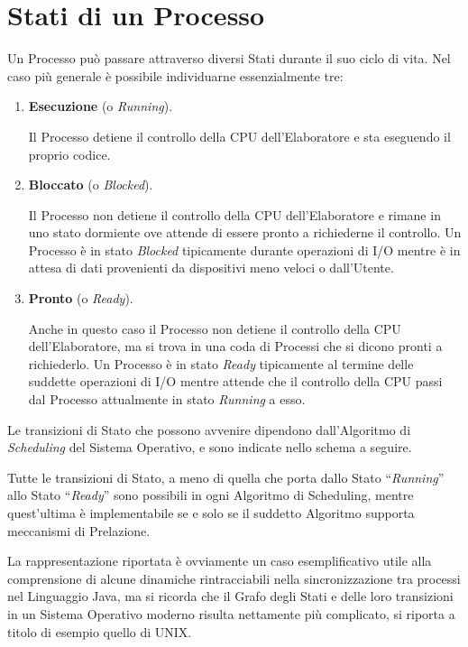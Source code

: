 \section{Stati di un Processo}
Un Processo può passare attraverso diversi Stati durante il suo ciclo di vita. Nel caso più generale è possibile individuarne essenzialmente tre:
\begin{enumerate}
    \item \textbf{Esecuzione} (o \textit{Running}). \par
    Il Processo detiene il controllo della CPU dell'Elaboratore e sta eseguendo il proprio codice.
    \item \textbf{Bloccato} (o \textit{Blocked}). \par
    Il Processo non detiene il controllo della CPU dell'Elaboratore e rimane in uno stato dormiente ove attende di essere pronto a richiederne il controllo. Un Processo è in stato \textit{Blocked} tipicamente durante operazioni di I/O mentre è in attesa di dati provenienti da dispositivi meno veloci o dall'Utente.
    \item \textbf{Pronto} (o \textit{Ready}). \par
    Anche in questo caso il Processo non detiene il controllo della CPU dell'Elaboratore, ma si trova in una coda di Processi che si dicono pronti a richiederlo. Un Processo è in stato \textit{Ready} tipicamente al termine delle suddette operazioni di I/O mentre attende che il controllo della CPU passi dal Processo attualmente in stato \textit{Running} a esso.
\end{enumerate}
Le transizioni di Stato che possono avvenire dipendono dall'Algoritmo di \textit{Scheduling} del Sistema Operativo, e sono indicate nello schema a seguire.

Tutte le transizioni di Stato, a meno di quella che porta dallo Stato ``\textit{Running}'' allo Stato ``\textit{Ready}'' sono possibili in ogni Algoritmo di Scheduling, mentre quest'ultima è implementabile se e solo se il suddetto Algoritmo supporta meccanismi di Prelazione. \par
La rappresentazione riportata è ovviamente un caso esemplificativo utile alla comprensione di alcune dinamiche rintracciabili nella sincronizzazione tra processi nel Linguaggio Java, ma si ricorda che il Grafo degli Stati e delle loro transizioni in un Sistema Operativo moderno risulta nettamente più complicato, si riporta a titolo di esempio quello di UNIX\cite{StatiProcessiDispense}.


